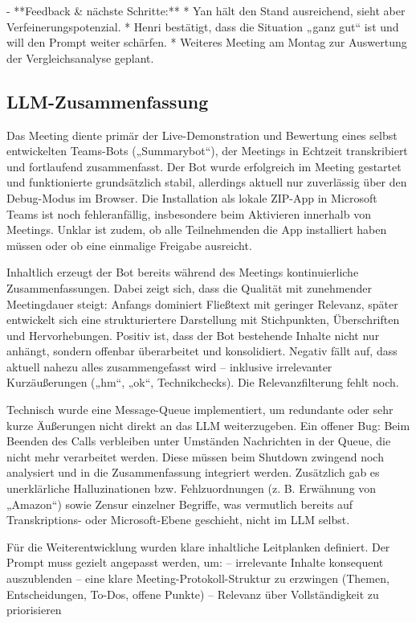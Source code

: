- **Feedback \& nächste Schritte:**  
  * Yan hält den Stand ausreichend, sieht aber Verfeinerungspotenzial.  
  * Henri bestätigt, dass die Situation „ganz gut“ ist und will den Prompt weiter schärfen.  
  * Weiteres Meeting am Montag zur Auswertung der Vergleichsanalyse geplant.

\subsection{LLM-Zusammenfassung}
\label{app:Weekly_llm}
Das Meeting diente primär der Live-Demonstration und Bewertung eines selbst entwickelten Teams-Bots („Summarybot“), der Meetings in Echtzeit transkribiert und fortlaufend zusammenfasst. Der Bot wurde erfolgreich im Meeting gestartet und funktionierte grundsätzlich stabil, allerdings aktuell nur zuverlässig über den Debug-Modus im Browser. Die Installation als lokale ZIP-App in Microsoft Teams ist noch fehleranfällig, insbesondere beim Aktivieren innerhalb von Meetings. Unklar ist zudem, ob alle Teilnehmenden die App installiert haben müssen oder ob eine einmalige Freigabe ausreicht.

Inhaltlich erzeugt der Bot bereits während des Meetings kontinuierliche Zusammenfassungen. Dabei zeigt sich, dass die Qualität mit zunehmender Meetingdauer steigt: Anfangs dominiert Fließtext mit geringer Relevanz, später entwickelt sich eine strukturiertere Darstellung mit Stichpunkten, Überschriften und Hervorhebungen. Positiv ist, dass der Bot bestehende Inhalte nicht nur anhängt, sondern offenbar überarbeitet und konsolidiert. Negativ fällt auf, dass aktuell nahezu alles zusammengefasst wird – inklusive irrelevanter Kurzäußerungen („hm“, „ok“, Technikchecks). Die Relevanzfilterung fehlt noch.

Technisch wurde eine Message-Queue implementiert, um redundante oder sehr kurze Äußerungen nicht direkt an das LLM weiterzugeben. Ein offener Bug: Beim Beenden des Calls verbleiben unter Umständen Nachrichten in der Queue, die nicht mehr verarbeitet werden. Diese müssen beim Shutdown zwingend noch analysiert und in die Zusammenfassung integriert werden. Zusätzlich gab es unerklärliche Halluzinationen bzw. Fehlzuordnungen (z. B. Erwähnung von „Amazon“) sowie Zensur einzelner Begriffe, was vermutlich bereits auf Transkriptions- oder Microsoft-Ebene geschieht, nicht im LLM selbst.

Für die Weiterentwicklung wurden klare inhaltliche Leitplanken definiert. Der Prompt muss gezielt angepasst werden, um:
– irrelevante Inhalte konsequent auszublenden
– eine klare Meeting-Protokoll-Struktur zu erzwingen (Themen, Entscheidungen, To-Dos, offene Punkte)
– Relevanz über Vollständigkeit zu priorisieren

